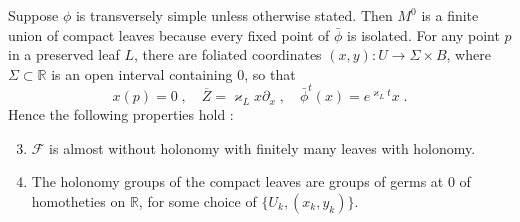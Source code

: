 \documentclass{memo-l}
\theoremstyle{plain}
\theoremstyle{definition}
\theoremstyle{remark}
\newcommand{\R}{\mathbb{R}}
\newcommand{\FF}{\mathcal{F}}
\numberwithin{section}{chapter}
\numberwithin{equation}{section}%
\begin{document}
Suppose $\phi$ is transversely simple unless otherwise stated. Then $M^0$ is a finite union of compact leaves because every fixed point of $\bar\phi$ is isolated. For any point $p$ in a preserved leaf $L$, there are foliated coordinates $(x,y):U\to\Sigma\times B$, where $\Sigma\subset\R$ is an open interval containing $0$, so that  \cite[Lemma~3.2]{AlvKordyLeichtnam2022}
\begin{equation}\label{overline Z = varkappa_Lx partial_x}
x(p)=0\;,\quad\overline Z=\varkappa_Lx\partial_x\;,\quad\bar\phi^t(x)=e^{\varkappa_Lt}x\;.
\end{equation}
Hence the following properties hold \cite[Propositions~3.4 and~3.5]{AlvKordyLeichtnam2022}:
\begin{enumerate}[{\rm(A)}]
\setcounter{enumi}{2}
\item\label{i: almost w/o hol} $\FF$ is almost without holonomy with finitely many leaves with holonomy.
\item\label{i: homotheties} The holonomy groups of the compact leaves are groups of germs at $0$ of homotheties on $\R$, for some choice of $\{U_k,(x_k,y_k)\}$.
\end{enumerate}
\end{document}
